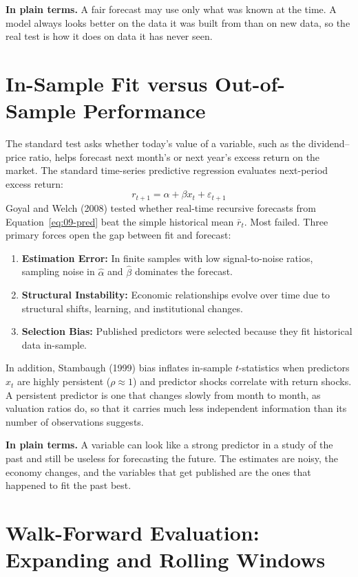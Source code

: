 \noindent\textbf{In plain terms.} A fair forecast may use only what was known at the time. A model always looks better on the data it was built from than on new data, so the real test is how it does on data it has never seen.

\section{In-Sample Fit versus Out-of-Sample Performance}
\label{sec:09-insample}

The standard test asks whether today's value of a variable, such as the dividend--price ratio, helps forecast next month's or next year's excess return on the market. The standard time-series predictive regression evaluates next-period excess return:
\begin{equation}
  r_{t+1} = \alpha + \beta x_t + \varepsilon_{t+1}
  \label{eq:09-pred}
\end{equation}
Goyal and Welch (2008) tested whether real-time recursive forecasts from Equation~\eqref{eq:09-pred} beat the simple historical mean $\bar{r}_t$. Most failed. Three primary forces open the gap between fit and forecast:
\begin{enumerate}
  \item \textbf{Estimation Error:} In finite samples with low signal-to-noise ratios, sampling noise in $\hat{\alpha}$ and $\hat{\beta}$ dominates the forecast.
  \item \textbf{Structural Instability:} Economic relationships evolve over time due to structural shifts, learning, and institutional changes.
  \item \textbf{Selection Bias:} Published predictors were selected because they fit historical data in-sample.
\end{enumerate}
In addition, Stambaugh (1999) bias inflates in-sample $t$-statistics when predictors $x_t$ are highly persistent ($\rho \approx 1$) and predictor shocks correlate with return shocks. A persistent predictor is one that changes slowly from month to month, as valuation ratios do, so that it carries much less independent information than its number of observations suggests.

\noindent\textbf{In plain terms.} A variable can look like a strong predictor in a study of the past and still be useless for forecasting the future. The estimates are noisy, the economy changes, and the variables that get published are the ones that happened to fit the past best.

\section{Walk-Forward Evaluation: Expanding and Rolling Windows}
\label{sec:09-walkforward}

